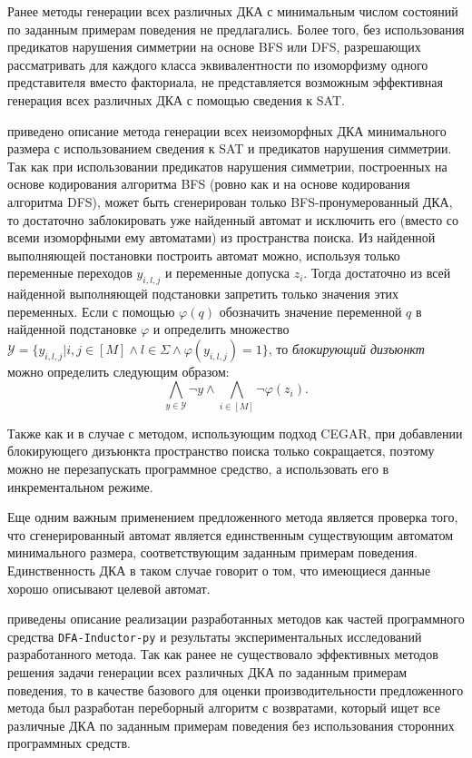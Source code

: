 Ранее методы генерации всех различных ДКА с минимальным числом состояний по заданным примерам поведения не предлагались. 
Более того, без использования предикатов нарушения симметрии на основе BFS или DFS, разрешающих рассматривать для каждого класса эквивалентности по изоморфизму одного представителя вместо факториала, не представляется возможным эффективная генерация всех различных ДКА с помощью сведения к SAT.

\insection{\ref{sec:findall:SAT-based}} приведено описание метода генерации всех неизоморфных ДКА минимального размера с использованием сведения к SAT и предикатов нарушения симметрии.
Так как при использовании предикатов нарушения симметрии, построенных на основе кодирования алгоритма BFS (ровно как и на основе кодирования алгоритма DFS), может быть сгенерирован только BFS-пронумерованный ДКА, то достаточно заблокировать уже найденный автомат и исключить его (вместо со всеми изоморфными ему автоматами) из пространства поиска.
Из найденной выполняющей постановки построить автомат можно, используя только переменные переходов $y_{i,l,j}$ и переменные допуска $z_{i}$.
Тогда достаточно из всей найденной выполняющей подстановки запретить только значения этих переменных.
Если с помощью $\varphi\left(q\right)$ обозначить значение переменной $q$ в найденной подстановке $\varphi$ и определить множество $\mathcal{Y} = \{y_{i,l,j} | i,j \in \left[M\right] \wedge l \in \Sigma \wedge \varphi\left(y_{i,l,j}\right) = 1\}$, то \emph{блокирующий дизъюнкт} можно определить следующим образом:
\begin{equation*}
\bigwedge_{y \in \mathcal{Y}} \neg y \wedge \bigwedge_{i \in \left[M\right]}\neg \varphi\left(z_{i}\right).
\end{equation*}

Также как и в случае с методом, использующим подход CEGAR, при добавлении блокирующего дизъюнкта пространство поиска только сокращается, поэтому можно не перезапускать программное средство, а использовать его в инкрементальном режиме.

Еще одним важным применением предложенного метода является проверка того, что сгенерированный автомат является единственным существующим автоматом минимального размера, соответствующим заданным примерам поведения.
Единственность ДКА в таком случае говорит о том, что имеющиеся данные хорошо описывают целевой автомат.

\insection{\ref{sec:findall:results}} приведены описание реализации разработанных методов как частей программного средства \texttt{DFA-Inductor-py} и результаты экспериментальных исследований разработанного метода. 
Так как ранее не существовало эффективных методов решения задачи генерации всех различных ДКА по заданным примерам поведения, то в качестве базового для оценки производительности предложенного метода был разработан переборный алгоритм с возвратами, который ищет все различные ДКА по заданным примерам поведения без использования сторонних программных средств.

